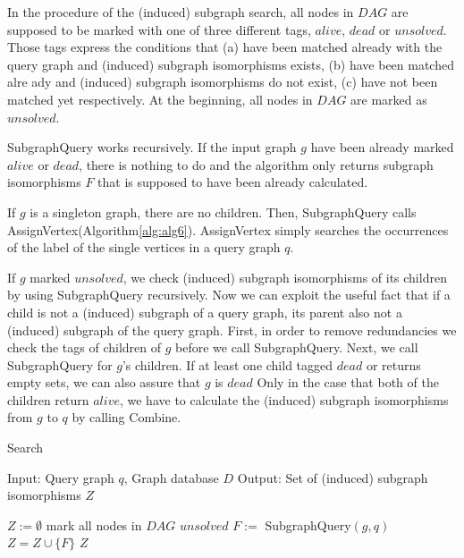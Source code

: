 In the procedure of the (induced) subgraph search, all nodes in $DAG$ are supposed to be marked with one of three different tags, $alive$, $dead$ or $unsolved$.
Those tags express the conditions that (a) have been matched already with the query graph and (induced) subgraph isomorphisms exists, (b) have been matched alre
ady and (induced) subgraph isomorphisms do not exist, (c) have not been matched yet respectively.
At the beginning, all nodes in $DAG$ are marked as $unsolved$.

SubgraphQuery works recursively.
If the input graph $g$ have been already marked $alive$ or $dead$, there is nothing to do and the algorithm only returns subgraph isomorphisms $F$ that is supposed to have been already calculated.

If $g$ is a singleton graph, there are no children.
Then, SubgraphQuery calls AssignVertex(Algorithm\ref{alg:alg6}).
AssignVertex simply searches the occurrences of the label of the single vertices in a query graph $q$.

If $g$ marked $unsolved$, we check (induced) subgraph isomorphisms of its children by using SubgraphQuery recursively.
Now we can exploit the useful fact that if a child is not a (induced) subgraph of a query graph, its parent also not a (induced) subgraph of the query graph.
First, in order to remove redundancies we check the tags of children of $g$ before we call SubgraphQuery. 
Next, we call SubgraphQuery for $g$'s children.
If at least one child tagged $dead$ or returns empty sets, we can also assure that $g$ is $dead$  
Only in the case that both of the children return $alive$, we have to calculate the (induced) subgraph isomorphisms from $g$ to $q$ by calling Combine.

\begin{algorithm}[t]
\caption{Search}
\label{alg:alg4}
\begin{algorithmic}
\STATE Input: Query graph $q$, Graph database $D$
\STATE Output: Set of (induced) subgraph isomorphisms $Z$
\end{algorithmic}
\begin{algorithmic}[1]
\STATE $Z := \emptyset$
\STATE mark all nodes in $DAG$ $unsolved$
	\STATE $F :=$ SubgraphQuery$(g,q)$
		\STATE $Z = Z \cup \{F\}$
	\ENDIF
\ENDFOR
\RETURN $Z$
\end{algorithmic}
\end{algorithm}

